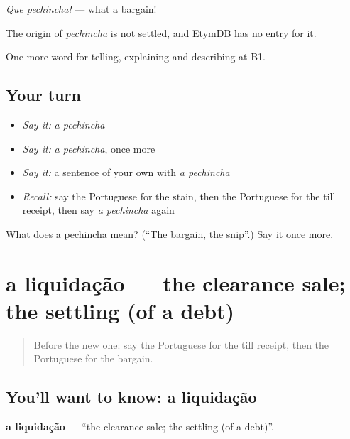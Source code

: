\emph{Que pechincha!} — what a bargain!

\begin{cousinweb}
The origin of \emph{pechincha} is not settled, and EtymDB has no entry for it.
\end{cousinweb}

\begin{grammarlens}[title={What you've built}]
One more word for telling, explaining and describing at B1.
\end{grammarlens}

\subsection*{Your turn}
\begin{itemize}
\raggedright
  \item \emph{Say it:} \emph{a pechincha}
  \item \emph{Say it:} \emph{a pechincha}, once more
  \item \emph{Say it:} a sentence of your own with \emph{a pechincha}
  \item \emph{Recall:} say the Portuguese for the stain, then the Portuguese for the till receipt, then say \emph{a pechincha} again
\end{itemize}

\begin{tcolorbox}[breakable,colback=teal!4,colframe=teal!35!black,title={Before you move on}]
What does a pechincha mean? (\textquotedblleft{}The bargain, the snip\textquotedblright{}.) Say it once more.
\end{tcolorbox}
\section[a liquidação]{a liquidação — the clearance sale; the settling (of a debt)}

\label{lesson:PT-C453-liquidacao}



\begin{quote}
Before the new one: say the Portuguese for the till receipt, then the Portuguese for the bargain.
\end{quote}

\subsection*{You'll want to know: a liquidação}
\textbf{a liquidação} — \textquotedblleft{}the clearance sale; the settling (of a debt)\textquotedblright{}.

